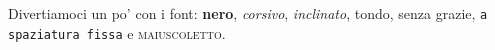 \documentclass{article}
\begin{document}
Divertiamoci un po' con i font: \textbf{nero}, \textit{corsivo}, 
\textsl{inclinato}, \textrm{tondo}, \textsf{senza grazie}, 
\texttt{a spaziatura fissa} e \textsc{maiuscoletto}.
\end{document}
